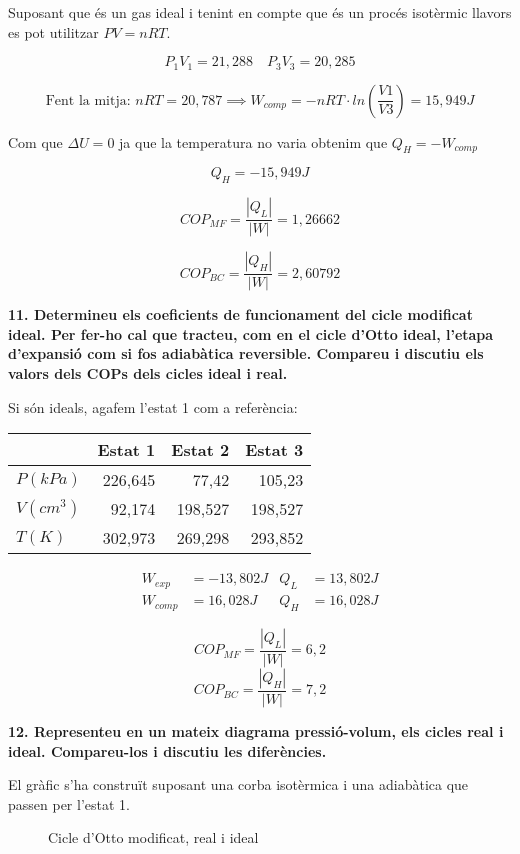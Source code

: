 \documentclass[a4paper]{article}
\begin{document}
Suposant que és un gas ideal i tenint en compte que és un procés isotèrmic llavors es pot utilitzar $ PV = nRT$.

$$ P_1 V_1 = 21,288 \quad P_3 V_3 = 20,285 $$

$$ \text{Fent la mitja: } nRT = 20,787 \implies W_{comp} = 
-nRT·ln\left(\frac{V1}{V3}\right) = \boxed{15,949 J} $$

Com que $\Delta U = 0$ ja que la temperatura no varia obtenim que $Q_H = -W_{comp}$

$$ Q_H = \boxed{-15,949 J} $$

$$ COP_{MF} = \frac{|Q_L|}{|W|} = \boxed{1,26662} $$

$$ COP_{BC} = \frac{|Q_H|}{|W|} = \boxed{2,60792} $$

\textbf{11. Determineu els coeficients de funcionament del cicle modificat ideal. Per fer-ho cal que tracteu, com en el cicle d'Otto ideal, l'etapa d'expansió com si fos adiabàtica reversible. Compareu i discutiu els valors dels COPs dels cicles ideal i real.}

Si són ideals, agafem l'estat 1 com a referència:

\begin{center}
	\begin{tabular}{l|rrr}
		& Estat 1 & Estat 2 & Estat 3 \\
		\hline
		$P(kPa)$ & 226,645 & 77,42 & 105,23 \\
		$V(cm^3)$ & 92,174 & 198,527 & 198,527 \\
		$T(K)$ & 302,973 & 269,298 & 293,852
	\end{tabular}
\end{center}

\begin{align*}
	W_{exp} &= -13,802 J &  Q_L &= 13,802 J \\
	W_{comp} &= 16,028 J &  Q_H &= 16,028 J
\end{align*}

$$ COP_{MF} = \frac{|Q_L|}{|W|} = 6,2 $$
$$ COP_{BC} = \frac{|Q_H|}{|W|} = 7,2 $$

\textbf{12. Representeu en un mateix diagrama pressió-volum, els cicles real i ideal. Compareu-los i discutiu les diferències.}

El gràfic s’ha construït suposant una corba isotèrmica i una adiabàtica que passen per l’estat 1.

\begin{figure}[H]
	\centering
	\caption{Cicle d'Otto modificat, real i ideal}
	\label{fig:otto_modificat}
\end{figure}
\end{document}
